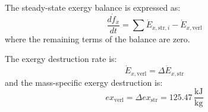 The steady-state exergy balance is expressed as:  
\[
\frac{d\dot{f}_x}{dt} = \sum \dot{E}_{x,\text{str},i} - \dot{E}_{x,\text{verl}}
\]  
where the remaining terms of the balance are zero.  

The exergy destruction rate is:  
\[
\dot{E}_{x,\text{verl}} = \Delta \dot{E}_{x,\text{str}}
\]  
and the mass-specific exergy destruction is:  
\[
ex_{\text{verl}} = \Delta ex_{\text{str}} = 125.47 \, \frac{\text{kJ}}{\text{kg}}
\]